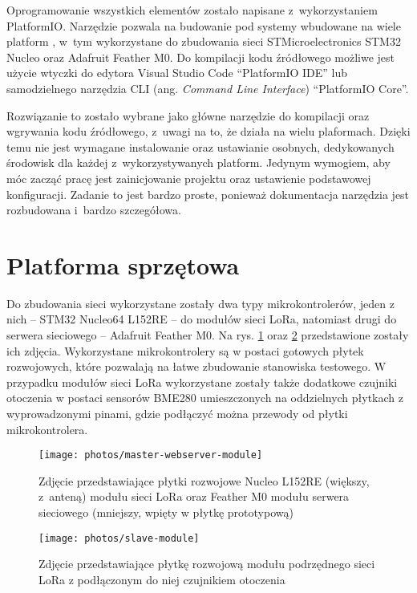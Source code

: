 Oprogramowanie wszystkich elementów zostało napisane z~wykorzystaniem PlatformIO. Narzędzie pozwala na budowanie pod
systemy wbudowane na wiele platform \cite{pio-platforms}, w~tym wykorzystane do zbudowania sieci STMicroelectronics
STM32 Nucleo oraz Adafruit Feather M0. Do kompilacji kodu źródłowego możliwe jest użycie wtyczki do edytora Visual
Studio Code \enquote{PlatformIO IDE} lub samodzielnego narzędzia CLI (ang. \textsl{Command Line Interface})
\enquote{PlatformIO Core}.

Rozwiązanie to zostało wybrane jako główne narzędzie do kompilacji oraz wgrywania kodu źródłowego, z~uwagi na to, że
działa na wielu plaformach. Dzięki temu nie jest wymagane instalowanie oraz ustawianie osobnych, dedykowanych środowisk
dla każdej z~wykorzystywanych platform. Jedynym wymogiem, aby móc zacząć pracę jest zainicjowanie projektu oraz
ustawienie podstawowej konfiguracji. Zadanie to jest bardzo proste, ponieważ dokumentacja narzędzia jest rozbudowana
i~bardzo szczegółowa.

\section{\label{sect:hardware-used}Platforma sprzętowa} Do zbudowania sieci wykorzystane zostały dwa typy
mikrokontrolerów, jeden z nich -- STM32 Nucleo64 L152RE -- do modułów sieci LoRa, natomiast drugi do serwera sieciowego
-- Adafruit Feather M0. Na rys. \ref{img:master-webserver-module} oraz \ref{img:slave-module} przedstawione zostały
ich zdjęcia. Wykorzystane mikrokontrolery są w postaci gotowych płytek rozwojowych, które pozwalają na łatwe zbudowanie
stanowiska testowego. W przypadku modułów sieci LoRa wykorzystane zostały także dodatkowe czujniki otoczenia w postaci
sensorów BME280 umieszczonych na oddzielnych płytkach z wyprowadzonymi pinami, gdzie podłączyć można przewody od płytki
mikrokontrolera.

\begin{figure}[!htbp]
    \centering
    \texttt{[image: photos/master-webserver-module]}
    \caption{\label{img:master-webserver-module}Zdjęcie przedstawiające płytki rozwojowe Nucleo L152RE (większy,
        z~anteną) modułu sieci LoRa oraz Feather M0 modułu serwera sieciowego (mniejszy, wpięty w płytkę prototypową)}
\end{figure}

\begin{figure}[!htbp]
    \centering
    \texttt{[image: photos/slave-module]}
    \caption{\label{img:slave-module}Zdjęcie przedstawiające płytkę rozwojową modułu podrzędnego sieci LoRa z
        podłączonym do niej czujnikiem otoczenia}
\end{figure}


